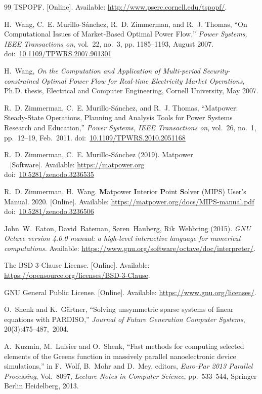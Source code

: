 \documentclass[12pt]{article}
\newcommand{\matpower}[0]{{\sc Matpower}}
\newcommand{\mips}[0]{{MIPS}}
\newcommand{\mipsname}[0]{{{\bf M}{\sc atpower} \textbf{I}nterior \textbf{P}oint \textbf{S}olver}}
\newcommand{\doi}[1]{doi:~\href{https://doi.org/#1}{#1}}
\numberwithin{equation}{section}
\numberwithin{table}{section}
\numberwithin{figure}{section}
\begin{document}
\clearpage
\begin{thebibliography}{99}
TSPOPF. [Online]. Available: \url{http://www.pserc.cornell.edu/tspopf/}.

H.~Wang, C.~E. Murillo-S{\'a}nchez, R.~D. Zimmerman, and R.~J. Thomas, ``On
Computational Issues of Market-Based Optimal Power Flow,'' \emph{Power
Systems, IEEE Transactions on}, vol.~22, no.~3, pp. 1185--1193, August 2007.
\doi{10.1109/TPWRS.2007.901301}

H.~Wang, \emph{On the Computation and Application of Multi-period Security-constrained Optimal Power Flow for Real-time Electricity Market Operations}, Ph.D. thesis, Electrical and Computer Engineering, Cornell University, May 2007.

R.~D. Zimmerman, C.~E. Murillo-S{\'a}nchez, and R.~J. Thomas, ``\matpower{}: Steady-State Operations, Planning and Analysis Tools for Power Systems Research and Education,'' \emph{Power Systems, IEEE Transactions on}, vol.~26, no.~1, pp.~12--19, Feb.~2011.
\doi{10.1109/TPWRS.2010.2051168}

R.~D. Zimmerman, C.~E. Murillo-S{\'a}nchez (2019). \matpower{}\\~
[Software]. Available: \url{https://matpower.org}\\
\doi{10.5281/zenodo.3236535}

R.~D. Zimmerman, H.~Wang. \mipsname{} (\mips{}) User's Manual. 2020.
[Online]. Available: \url{https://matpower.org/docs/MIPS-manual.pdf}\\
\doi{10.5281/zenodo.3236506}

John~W.~Eaton, David~Bateman, S{\o}ren~Hauberg, Rik~Wehbring (2015). \emph{GNU Octave version 4.0.0 manual: a high-level interactive language for numerical computations.} Available: \url{https://www.gnu.org/software/octave/doc/interpreter/}.

The BSD 3-Clause License. [Online]. Available: \url{https://opensource.org/licenses/BSD-3-Clause}.

GNU General Public License. [Online]. Available: \url{https://www.gnu.org/licenses/}.

O.~Shenk and K.~G\"artner, ``Solving unsymmetric sparse systems of linear equations with PARDISO,'' \emph{Journal of Future Generation Computer Systems}, 20(3):475--487,~2004.

A.~Kuzmin, M.~Luisier and O.~Shenk, ``Fast methods for computing selected elements of the Greens function in massively parallel nanoelectronic device simulations,'' in F.~Wolf, B.~Mohr and D.~Mey, editors, \emph{Euro-Par 2013 Parallel Processing}, Vol.~8097, \emph{Lecture Notes in Computer Science}, pp.~533--544, Springer Berlin Heidelberg, 2013.

\end{thebibliography}
\end{document}
